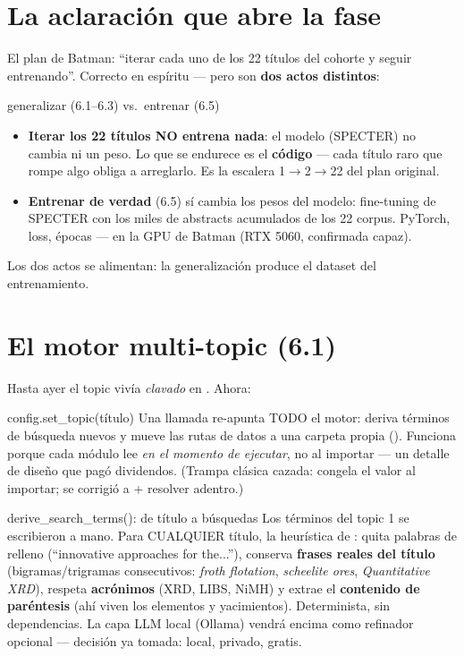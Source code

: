 \documentclass[11pt,a4paper]{article}
\begin{document}

\section{La aclaración que abre la fase}

El plan de Batman: ``iterar cada uno de los 22 títulos del cohorte y seguir entrenando''.
Correcto en espíritu — pero son \textbf{dos actos distintos}:

\begin{concepto}{generalizar (6.1--6.3) vs.\ entrenar (6.5)}
\begin{itemize}
  \item \textbf{Iterar los 22 títulos NO entrena nada}: el modelo (SPECTER) no cambia ni un
        peso. Lo que se endurece es el \textbf{código} — cada título raro que rompe algo
        obliga a arreglarlo. Es la escalera 1$\rightarrow$2$\rightarrow$22 del plan original.
  \item \textbf{Entrenar de verdad} (6.5) sí cambia los pesos del modelo: fine-tuning de
        SPECTER con los miles de abstracts acumulados de los 22 corpus. PyTorch, loss,
        épocas — en la GPU de Batman (RTX 5060, confirmada capaz).
\end{itemize}
Los dos actos se alimentan: la generalización produce el dataset del entrenamiento.
\end{concepto}

\section{El motor multi-topic (6.1)}

Hasta ayer el topic vivía \emph{clavado} en . Ahora:

\begin{concepto}{config.set\_topic(título)}
Una llamada re-apunta TODO el motor: deriva términos de búsqueda nuevos y mueve las rutas de
datos a una carpeta propia (). Funciona porque cada módulo
lee  \emph{en el momento de ejecutar}, no al importar — un detalle de
diseño que pagó dividendos. (Trampa clásica cazada:  congela
el valor al importar; se corrigió a  + resolver adentro.)
\end{concepto}

\begin{concepto}{derive\_search\_terms(): de título a búsquedas}
Los términos del topic 1 se escribieron a mano. Para CUALQUIER título, la heurística de
: quita palabras de relleno (``innovative approaches for the...''),
conserva \textbf{frases reales del título} (bigramas/trigramas consecutivos: \emph{froth
flotation}, \emph{scheelite ores}, \emph{Quantitative XRD}), respeta \textbf{acrónimos}
(XRD, LIBS, NiMH) y extrae el \textbf{contenido de paréntesis} (ahí viven los elementos y
yacimientos). Determinista, sin dependencias. La capa LLM local (Ollama) vendrá encima como
refinador opcional — decisión ya tomada: local, privado, gratis.
\end{concepto}
\end{document}
